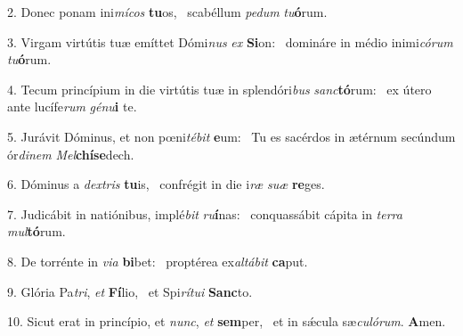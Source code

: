 2. Donec ponam ini\textit{mí}\textit{cos} \textbf{tu}os, \ast\  scabéllum \textit{pe}\textit{dum} \textit{tu}\textbf{ó}rum.\

3. Virgam virtútis tuæ emíttet Dómi\textit{nus} \textit{ex} \textbf{Si}on: \ast\  domináre in médio inimi\textit{có}\textit{rum} \textit{tu}\textbf{ó}rum.\

4. Tecum princípium in die virtútis tuæ in splendóri\textit{bus} \textit{sanc}\textbf{tó}rum: \ast\  ex útero ante lucífe\textit{rum} \textit{gé}\textit{nu}\textbf{i} te.\

5. Jurávit Dóminus, et non pœni\textit{té}\textit{bit} \textbf{e}um: \ast\  Tu es sacérdos in ætérnum secúndum ór\textit{di}\textit{nem} \textit{Mel}\textbf{chí}\textbf{se}dech.\

6. Dóminus a \textit{dex}\textit{tris} \textbf{tu}is, \ast\  confrégit in die i\textit{ræ} \textit{su}\textit{æ} \textbf{re}ges.\

7. Judicábit in natiónibus, implé\textit{bit} \textit{ru}\textbf{í}nas: \ast\  conquassábit cápita in \textit{ter}\textit{ra} \textit{mul}\textbf{tó}rum.\

8. De torrénte in \textit{vi}\textit{a} \textbf{bi}bet: \ast\  proptérea ex\textit{al}\textit{tá}\textit{bit} \textbf{ca}put.\

9. Glória Pa\textit{tri}, \textit{et} \textbf{Fí}lio, \ast\  et Spi\textit{rí}\textit{tu}\textit{i} \textbf{Sanc}to.\

10. Sicut erat in princípio, et \textit{nunc}, \textit{et} \textbf{sem}per, \ast\  et in sǽcula sæ\textit{cu}\textit{ló}\textit{rum}. \textbf{A}men.\

